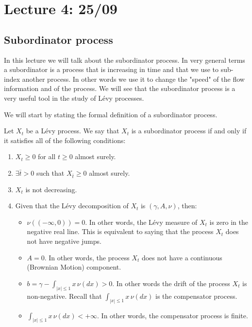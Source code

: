 \chapter{Lecture 4: 25/09}

\section{Subordinator process}
In this lecture we will talk about the subordinator process. In very general 
terms a subordinator is a process that is increasing in time and that we use to
sub-index another process. In other words we use it to change the "speed" of the
flow information and of the process. We will see that the subordinator process
is a very useful tool in the study of L\'evy processes.

We will start by stating the formal definition of a subordinator process.

\begin{definition}
Let $X_t$ be a L\'evy process. We say that $X_t$ is a subordinator process if
and only if it satisfies all of the following conditions:

\begin{enumerate}[1)]
    \item $X_t \geq 0$ for all $t \geq 0$ almost surely.
    \item $\exists \bar{t} > 0$ such that $X_{\bar{t}} \geq 0$ almost surely.
    \item $X_t$ is not decreasing.
    \item Given that the L\'evy decomposition of $X_t$ is $(\gamma, A, \nu)$,
    then:
    \begin{itemize}
        \item $\nu((-\infty, 0)) = 0$. In other words, the L\'evy measure of
        $X_t$ is zero in the negative real line. This is equivalent to saying
        that the process $X_t$ does not have negative jumps.
        \item $A=0$. In other words, the process $X_t$ does not have a
        continuous (Brownian Motion) component.
        \item $b = \gamma - \int_{|x|\leq1} x \, \nu(dx) > 0$. In other words
        the drift of the process $X_t$ is non-negative. Recall that $\int_{
        |x|\leq1} x \, \nu(dx)$ is the compensator process.
        \item $\int_{|x|\leq 1} x \, \nu(dx) < + \infty$. In other words, the
        compensator process is finite.
    \end{itemize}
\end{enumerate}
\end{definition}


